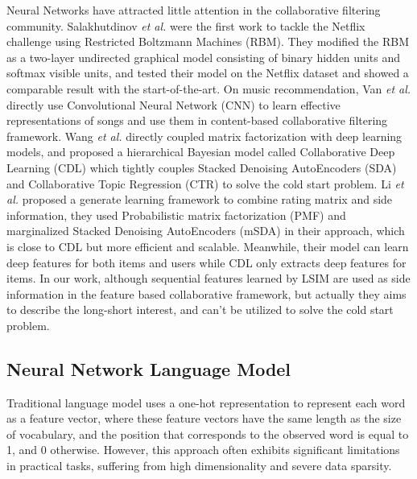 \documentclass{llncs}
\begin{document}
Neural Networks have attracted little attention in the collaborative filtering community.
Salakhutdinov \textit{et al.} \cite{salakhutdinov2007restricted} were the first
work to tackle the Netflix challenge using Restricted Boltzmann Machines (RBM).
They modified the RBM as a two-layer undirected graphical model
consisting of binary hidden units and softmax visible units,
and tested their model on the Netflix dataset and
showed a comparable result with the start-of-the-art.
On music recommendation, Van \textit{et al.} \cite{van2013deep}
directly use Convolutional Neural Network (CNN) to learn effective representations
of songs and use them in content-based collaborative filtering framework.
Wang \textit{et al.} \cite{wang2015collaborative} 
directly coupled matrix factorization with deep learning models,
and proposed a hierarchical Bayesian model called Collaborative Deep Learning (CDL)
which tightly couples Stacked Denoising AutoEncoders (SDA) \cite{vincent2008extracting} and
Collaborative Topic Regression (CTR) \cite{wang2011collaborative} to solve the cold start problem.
Li \textit{et al.} \cite{li2015deep} proposed a generate learning framework
to combine rating matrix and side information, they used 
Probabilistic matrix factorization (PMF) \cite{salakhutdinov2011probabilistic} and
marginalized Stacked Denoising AutoEncoders (mSDA) \cite{chen2012marginalized}
in their approach, which is close to CDL but more efficient and scalable.
Meanwhile, their model can learn deep features for both items and users
while CDL only extracts deep features for items.
In our work, although sequential features learned by LSIM are used as side information
in the feature based collaborative framework, but actually they aims to describe
the long-short interest, and can't be utilized to solve the cold start problem.

\subsection{Neural Network Language Model}
Traditional language model uses a one-hot representation to represent each word
as a feature vector, where these feature vectors have the same length as the size
of vocabulary, and the position that corresponds to the observed word is equal to 1,
and 0 otherwise. However, this approach often exhibits significant limitations
in practical tasks, suffering from high dimensionality and severe data sparsity.
\end{document}
